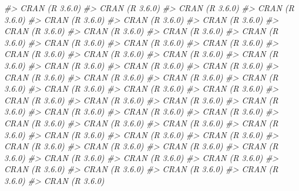 \documentclass[]{krantz}
\makeatletter
\newenvironment{Shaded}{\begin{snugshade}}{\end{snugshade}}
\newcommand{\CommentTok}[1]{\textcolor[rgb]{0.37,0.37,0.37}{\textit{#1}}}
\newenvironment{kframe}{%
\medskip{}
\setlength{\fboxsep}{.8em}
 \def\at@end@of@kframe{}%
 \ifinner\ifhmode%
  \def\at@end@of@kframe{\end{minipage}}%
  \begin{minipage}{\columnwidth}%
 \fi\fi%
 \def\FrameCommand##1{\hskip\@totalleftmargin \hskip-\fboxsep
 \colorbox{shadecolor}{##1}\hskip-\fboxsep
     \hskip-\linewidth \hskip-\@totalleftmargin \hskip\columnwidth}%
 \MakeFramed {\advance\hsize-\width
   \@totalleftmargin\z@ \linewidth\hsize
   \@setminipage}}%
 {\par\unskip\endMakeFramed%
 \at@end@of@kframe}
\renewenvironment{Shaded}{\begin{kframe}}{\end{kframe}}
\makeatother
\begin{document}
\begin{Shaded}
\begin{Highlighting}[]
\CommentTok{#>  CRAN (R 3.6.0)                 }
\CommentTok{#>  CRAN (R 3.6.0)                 }
\CommentTok{#>  CRAN (R 3.6.0)                 }
\CommentTok{#>  CRAN (R 3.6.0)                 }
\CommentTok{#>  CRAN (R 3.6.0)                 }
\CommentTok{#>  CRAN (R 3.6.0)                 }
\CommentTok{#>  CRAN (R 3.6.0)                 }
\CommentTok{#>  CRAN (R 3.6.0)                 }
\CommentTok{#>  CRAN (R 3.6.0)                 }
\CommentTok{#>  CRAN (R 3.6.0)                 }
\CommentTok{#>  CRAN (R 3.6.0)                 }
\CommentTok{#>  CRAN (R 3.6.0)                 }
\CommentTok{#>  CRAN (R 3.6.0)                 }
\CommentTok{#>  CRAN (R 3.6.0)                 }
\CommentTok{#>  CRAN (R 3.6.0)                 }
\CommentTok{#>  CRAN (R 3.6.0)                 }
\CommentTok{#>  CRAN (R 3.6.0)                 }
\CommentTok{#>  CRAN (R 3.6.0)                 }
\CommentTok{#>  CRAN (R 3.6.0)                 }
\CommentTok{#>  CRAN (R 3.6.0)                 }
\CommentTok{#>  CRAN (R 3.6.0)                 }
\CommentTok{#>  CRAN (R 3.6.0)                 }
\CommentTok{#>  CRAN (R 3.6.0)                 }
\CommentTok{#>  CRAN (R 3.6.0)                 }
\CommentTok{#>  CRAN (R 3.6.0)                 }
\CommentTok{#>  CRAN (R 3.6.0)                 }
\CommentTok{#>  CRAN (R 3.6.0)                 }
\CommentTok{#>  CRAN (R 3.6.0)                 }
\CommentTok{#>  CRAN (R 3.6.0)                 }
\CommentTok{#>  CRAN (R 3.6.0)                 }
\CommentTok{#>  CRAN (R 3.6.0)                 }
\CommentTok{#>  CRAN (R 3.6.0)                 }
\CommentTok{#>  CRAN (R 3.6.0)                 }
\CommentTok{#>  CRAN (R 3.6.0)                 }
\CommentTok{#>  CRAN (R 3.6.0)                 }
\CommentTok{#>  CRAN (R 3.6.0)                 }
\CommentTok{#>  CRAN (R 3.6.0)                 }
\CommentTok{#>  CRAN (R 3.6.0)                 }
\CommentTok{#>  CRAN (R 3.6.0)                 }
\CommentTok{#>  CRAN (R 3.6.0)                 }
\CommentTok{#>  CRAN (R 3.6.0)                 }
\CommentTok{#>  CRAN (R 3.6.0)                 }
\CommentTok{#>  CRAN (R 3.6.0)                 }
\CommentTok{#>  CRAN (R 3.6.0)                 }
\CommentTok{#>  CRAN (R 3.6.0)                 }
\CommentTok{#>  CRAN (R 3.6.0)                 }
\CommentTok{#>  CRAN (R 3.6.0)                 }
\CommentTok{#>  CRAN (R 3.6.0)                 }
\CommentTok{#>  CRAN (R 3.6.0)                 }
\CommentTok{#>  CRAN (R 3.6.0)                 }
\CommentTok{#>  CRAN (R 3.6.0)                 }
\CommentTok{#>  CRAN (R 3.6.0)                 }
\CommentTok{#>  CRAN (R 3.6.0)                 }
\CommentTok{#>  CRAN (R 3.6.0)                 }

\end{Highlighting}
\end{Shaded}
\end{document}
